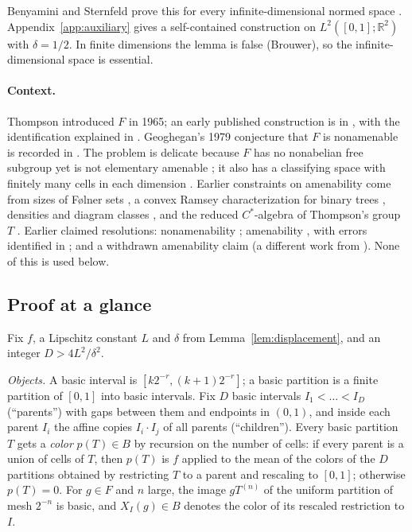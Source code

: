 \documentclass[11pt]{article}
\newcommand{\R}{\mathbb R}
\theoremstyle{definition}
\numberwithin{equation}{section}
\begin{document}
Benyamini and Sternfeld prove this for every infinite-dimensional normed
space \cite[Theorem, part~(3), p.~439]{BenyaminiSternfeld1983}.
Appendix~\ref{app:auxiliary} gives a self-contained construction on
$L^2([0,1];\R^2)$ with $\delta=1/2$. In finite dimensions the lemma is
false (Brouwer), so the infinite-dimensional space is essential.

\paragraph{Context.}
Thompson introduced $F$ in 1965; an early published construction is in
\cite{McKenzieThompson1973}, with the identification explained in
\cite[pp.~215--216]{CannonFloydParry1996}. Geoghegan's 1979 conjecture
that $F$ is nonamenable is recorded in
\cite[p.~227]{CannonFloydParry1996}. The problem is delicate because $F$
has no nonabelian free subgroup \cite[Theorem~3.1]{BrinSquier1985} yet is
not elementary amenable \cite[Theorem~4.10]{CannonFloydParry1996}; it
also has a classifying space with finitely many cells in each dimension
\cite{BrownGeoghegan1984}. Earlier constraints on amenability come from
sizes of F\o lner sets \cite[Theorem~1.1]{MooreFolner2013}, a convex
Ramsey characterization for binary trees \cite[Theorem~3.1]{Moore2013},
densities and diagram classes \cite{Guba2025Density,Guba2026}, and the
reduced $C^*$-algebra of Thompson's group $T$
\cite[Theorem~5.5]{HaagerupOlesen2017}. Earlier claimed resolutions:
nonamenability \cite{Akhmedov2021}; amenability \cite{Shavgulidze2009},
with errors identified in \cite{Moore2011Critique}; and a withdrawn
amenability claim \cite{Moore2012Withdrawn} (a different work from
\cite{Moore2013}). None of this is used below.

\subsection{Proof at a glance}

Fix $f$, a Lipschitz constant $L$ and $\delta$ from
Lemma~\ref{lem:displacement}, and an integer $D>4L^2/\delta^2$.

\emph{Objects.} A basic interval is $[k2^{-r},(k+1)2^{-r}]$; a basic
partition is a finite partition of $[0,1]$ into basic intervals. Fix
$D$ basic intervals $I_1<\dots<I_D$ (``parents'') with gaps between
them and endpoints in $(0,1)$, and inside each parent $I_i$ the affine
copies $I_i\cdot I_j$ of all parents (``children''). Every basic
partition $T$ gets a \emph{color} $p(T)\in B$ by recursion on the number
of cells: if every parent is a union of cells of $T$, then $p(T)$ is
$f$ applied to the mean of the colors of the $D$ partitions obtained by
restricting $T$ to a parent and rescaling to $[0,1]$; otherwise
$p(T)=0$. For $g\in F$ and $n$ large, the image $gT^{(n)}$ of the uniform
partition of mesh $2^{-n}$ is basic, and $X_I(g)\in B$ denotes the color
of its rescaled restriction to $I$.
\end{document}
